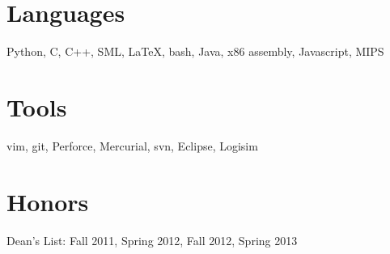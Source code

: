 \documentclass[margin]{res}
\begin{document}
\begin{resume}
\section{Languages}
  Python, C, C++, SML, \LaTeX, bash, Java, x86 assembly, Javascript, MIPS

\section{Tools}
  vim, git, Perforce, Mercurial, svn, Eclipse, Logisim

\section{Honors}
  Dean's List: Fall 2011, Spring 2012, Fall 2012, Spring 2013 \\

\end{resume}
\end{document}
